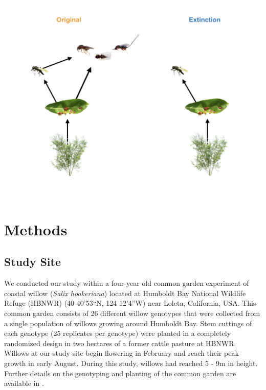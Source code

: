 \documentclass[11pt,]{article}
\let\origfigure\figure
\let\endorigfigure\endfigure
\renewenvironment{figure}[1][2] {
    \expandafter\origfigure\expandafter[H]
} {
    \endorigfigure
}
\begin{document}
\begin{figure}
\centering
\includegraphics{../analyses/complex_simple_foodwebs_v3.jpeg}
\caption{\label{fig:Conceptual}Experimental manipulation of food-web
structure associated with a leaf-galling midge (\emph{Iteomyia
salicisverruca}) feeding on the willow \emph{Salix hookeriana}. Black
arrows denote the flow of energy in this network of trophic
interactions. In the original food web, we allowed the full suite of egg
and larval parasitoids to impose selection. In the removal food web, we
used mesh bags to exclude the guild of larval parasitoids, only allowing
the egg parasitoid (\emph{Platygaster} sp.) to impose selection. Note
that larval parasitoids also impose indirect effects on gall midge
fitness through intraguild predation on the egg parasitoid. Larval
parasitoids include the following species (from left to right):
\emph{Mesopolobus} sp. (Family: Pteromalidae); \emph{Tetrastichus} sp.
(Family: Eulophidae); and \emph{Torymus} sp. (Family: Torymidae).}
\end{figure}

\section{Methods}\label{methods}

\subsection{Study Site}\label{study-site}

We conducted our study within a four-year old common garden experiment
of coastal willow (\emph{Salix hookeriana}) located at Humboldt Bay
National Wildlife Refuge (HBNWR) (40 40'53``N, 124 12'4''W) near Loleta,
California, USA. This common garden consists of 26 different willow
genotypes that were collected from a single population of willows
growing around Humboldt Bay. Stem cuttings of each genotype (25
replicates per genotype) were planted in a completely randomized design
in two hectares of a former cattle pasture at HBNWR. Willows at our
study site begin flowering in February and reach their peak growth in
early August. During this study, willows had reached 5 - 9m in height.
Further details on the genotyping and planting of the common garden are
available in \citet{Barbour2015}.
\end{document}
